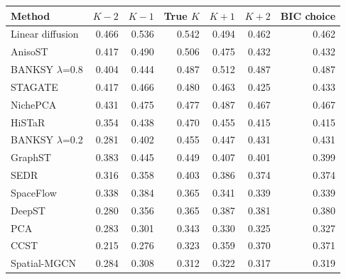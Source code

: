 \footnotesize
\begin{tabular}{lrrrrrr}
\toprule
Method & $K-2$ & $K-1$ & True $K$ & $K+1$ & $K+2$ & BIC choice \\
\midrule
Linear diffusion & 0.466 & 0.536 & 0.542 & 0.494 & 0.462 & 0.462 \\
AnisoST & 0.417 & 0.490 & 0.506 & 0.475 & 0.432 & 0.432 \\
BANKSY $\lambda$=0.8 & 0.404 & 0.444 & 0.487 & 0.512 & 0.487 & 0.487 \\
STAGATE & 0.417 & 0.466 & 0.480 & 0.463 & 0.425 & 0.433 \\
NichePCA & 0.431 & 0.475 & 0.477 & 0.487 & 0.467 & 0.467 \\
HiSTaR & 0.354 & 0.438 & 0.470 & 0.455 & 0.415 & 0.415 \\
BANKSY $\lambda$=0.2 & 0.281 & 0.402 & 0.455 & 0.447 & 0.431 & 0.431 \\
GraphST & 0.383 & 0.445 & 0.449 & 0.407 & 0.401 & 0.399 \\
SEDR & 0.316 & 0.358 & 0.403 & 0.386 & 0.374 & 0.374 \\
SpaceFlow & 0.338 & 0.384 & 0.365 & 0.341 & 0.339 & 0.339 \\
DeepST & 0.280 & 0.356 & 0.365 & 0.387 & 0.381 & 0.380 \\
PCA & 0.283 & 0.301 & 0.343 & 0.330 & 0.325 & 0.327 \\
CCST & 0.215 & 0.276 & 0.323 & 0.359 & 0.370 & 0.371 \\
Spatial-MGCN & 0.284 & 0.308 & 0.312 & 0.322 & 0.317 & 0.319 \\
\bottomrule
\end{tabular}
